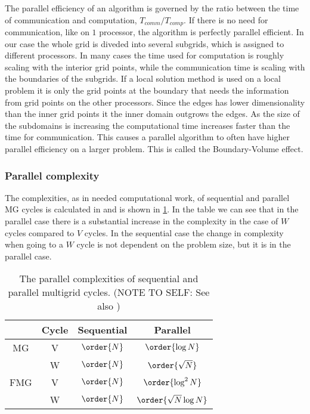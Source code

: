 		The parallel efficiency of an algorithm is governed by the ratio between the
		time of communication and computation, \(T_{comm}/T_{comp}\). If there is no
		need for communication, like on \(1\) processor, the algorithm is perfectly
		parallel efficient. In our case the whole grid is diveded into several subgrids,
		which is assigned to different processors. In many cases the time used for
		computation is roughly scaling with the interior grid points, while the
		communication time is scaling with the boundaries of the subgrids. If a
		local solution method is used on a local problem it is only the grid points
		at the boundary that needs the information from grid points on the other
		processors. Since the edges has lower dimensionality than the inner grid
		points it the inner domain outgrows the edges. As the size of the subdomains is increasing
		the computational time increases
		faster than the time for communication. This causes a parallel algorithm to often have
		higher parallel efficiency on a larger problem. This is called the Boundary-Volume effect.

		\subsubsection{Parallel complexity}
			\label{sec:para_comp}
			The complexities, as in needed computational work, of sequential and
			parallel MG cycles is calculated in \cite{hackbusch_multigrid_1982} and is
			shown in \cref{tab:parallel_complexity}. In the table we can see that in
			the parallel case there is a substantial increase in the complexity in the
			case of \(W\) cycles compared to \(V\) cycles. In the sequential case the
			change in complexity when going to a \(W\) cycle is not dependent on the
			problem size, but it is in the parallel case.


		\begin{table}
			\centering
			\begin{tabular}{ c  c c c}
				& Cycle & Sequential & Parallel
			  	\\  \hline
			  	MG & V & \(\order{N}\) & \(\order{\log N}\)
			  	\\
			  	& W & $\order{N}$ & $\order{\sqrt{N}}$
			  	\\ \hline
				FMG & V & $\order{N}$ & $\order{\log^2 N}$
				\\
				& W & $\order{N}$ & \( \order{\sqrt{N} \log{N}} \)
			\end{tabular}
			\caption{The parallel complexities of sequential and parallel multigrid cycles. (NOTE TO SELF: See also \cite{zhukov_parallel_2014})}
			\label{tab:parallel_complexity}
		\end{table}



